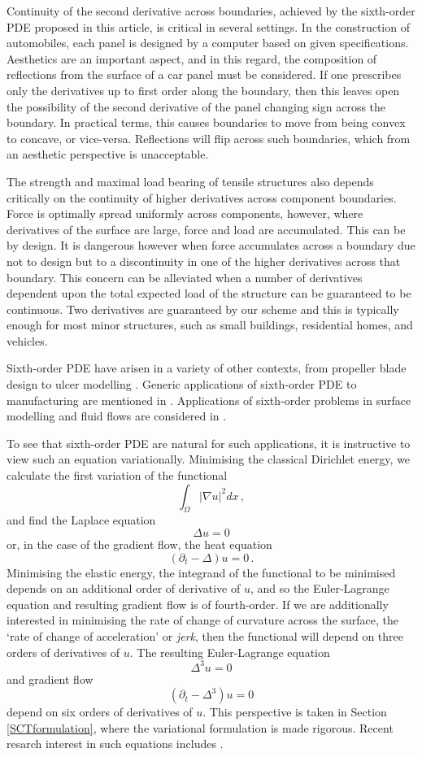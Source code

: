 \documentclass[a4paper,final]{siamltex}
\begin{document}
Continuity of the second derivative across boundaries, achieved by the
sixth-order PDE proposed in this article, is critical in several settings.
In the construction of automobiles, each panel is designed by a computer based on given
specifications.
Aesthetics are an important aspect, and in this regard, the composition of reflections
from the surface of a car panel must be considered.
If one prescribes only the derivatives up to first order along the boundary, then this
leaves open the possibility of the second derivative of the panel changing sign across the
boundary. In practical terms, this causes boundaries to move from being convex
to concave, or vice-versa.
Reflections will flip across such boundaries, which from an aesthetic
perspective is unacceptable.

The strength and maximal load bearing of tensile structures also depends
critically on the continuity of higher derivatives across component boundaries.
Force is optimally spread uniformly across components, however, where
derivatives of the surface are large, force and load are accumulated.
This can be by design.
It is dangerous however when force accumulates across a boundary due not to
design but to a discontinuity in one of the higher derivatives across that
boundary.
This concern can be alleviated when a number of derivatives dependent upon the
total expected load of the structure can be guaranteed to be continuous.
Two derivatives are guaranteed by our scheme and this is typically enough for
most minor structures, such as small buildings, residential homes, and
vehicles.

Sixth-order PDE have arisen in a variety of other contexts, from
propeller blade design \cite{prop} to ulcer modelling \cite{ulcer}.
Generic applications of sixth-order PDE to manufacturing are mentioned in
\cite{benson1967general,bloor1995complex}. Applications of sixth-order 
problems in surface modelling and fluid flows 
are considered in \cite{LX07,TDQ14}. 

To see that sixth-order PDE are natural for such applications, it is
instructive to view such an equation variationally.
Minimising the classical Dirichlet energy, we calculate the first variation of
the functional
\[
\int_\Omega |\nabla u|^2dx\,,
\]
and find the Laplace equation
\[
\Delta u = 0
\]
or, in the case of the gradient flow, the heat equation
\[
(\partial_t - \Delta )u = 0\,.
\]
Minimising the elastic energy, the integrand of the functional to be minimised
depends on an additional order of derivative of $u$, and so the Euler-Lagrange equation
and resulting gradient flow is of fourth-order.
If we are additionally interested in minimising the rate of change of curvature
across the surface, the `rate of change of acceleration' or \emph{jerk}, then
the functional will depend on three orders of derivatives of $u$.
The resulting Euler-Lagrange equation
\[
\Delta^3 u = 0
\]
and gradient flow
\[
(\partial_t - \Delta^3)u = 0
\]
depend on six orders of derivatives of $u$.
This perspective is taken in Section \ref{SCTformulation}, where the
variational formulation is made rigorous.
Recent resarch interest in such equations includes
\cite{rybka1,rybka2,parkins,rybka3}.
\end{document}
